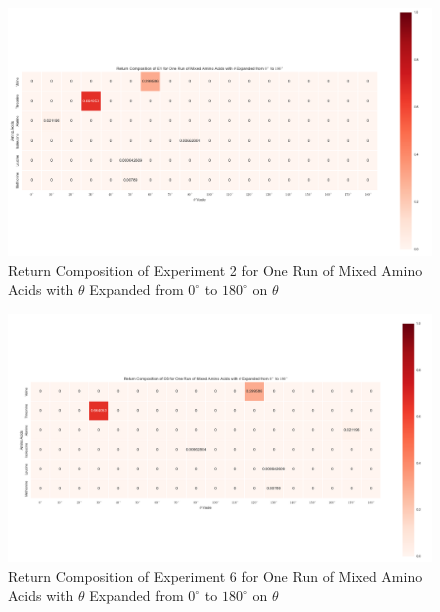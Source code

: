 \begin{figure}[!ht] 
\centering
\includegraphics[scale=0.4]{Figures/mixture_return_composition_of_E1_for_one_run_theta_0_180.png}
\caption{Return Composition of Experiment 2 for One Run of Mixed Amino Acids with $\theta$ Expanded from $0^{\circ}$ to $180^{\circ}$ on $\theta$} 
\label{fig:5.5}
\end{figure}

\begin{figure}[!ht] 
\centering
\includegraphics[scale=0.4]{Figures/mixture_return_composition_of_E6_for_one_run_theta_0_180.png}
\caption{Return Composition of Experiment 6 for One Run of Mixed Amino Acids with $\theta$ Expanded from $0^{\circ}$ to $180^{\circ}$ on $\theta$} 
\label{fig:5.6}
\end{figure}

